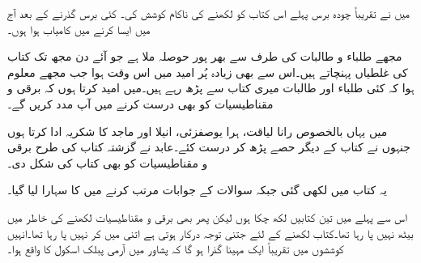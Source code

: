 میں نے تقریباً چودہ برس پہلے اس کتاب کو لکھنے کی ناکام کوشش کی۔ کئی برس گذرنے کے بعد آج میں ایسا کرنے میں کامیاب ہوا ہوں۔

مجھے طلباء و طالبات کی طرف سے بھر پور حوصلہ ملا ہے جو آئے دن مجھ تک کتاب کی غلطیاں پہنچاتے ہیں۔اس سے بھی زیادہ پُر امید میں اس وقت ہوا جب مجھے معلوم ہوا کہ کئی طلباء اور طالبات میری کتاب سے پڑھ رہے ہیں۔میں امید کرتا ہوں کہ برقی و مقناطیسیات کو بھی درست کرنے میں آپ مدد کریں گے۔

میں یہاں بالخصوص رانا لیاقت، ہرا یوصفزئی، انیلا اور ماجد کا شکریہ ادا کرتا ہوں جنہوں نے کتاب کے دیگر حصے پڑھ کر درست کئے۔عابد نے گزشتہ کتاب کی طرح برقی و مقناطیسیات کو بھی کتاب کی شکل دی۔

یہ کتاب  میں لکھی گئی جبکہ سوالات کے جوابات مرتب کرنے میں  کا سہارا لیا گیا۔

اس سے پہلے میں تین کتابیں لکھ چکا ہوں لیکن پھر بھی برقی و مقناطیسیات لکھنے کی خاطر میں بیٹھ نہیں پا رہا تھا۔کتاب لکھنے کے لئے جتنی توجہ درکار ہوتی ہے اتنی میں کر نہیں پا رہا تھا۔انہیں کوششوں میں تقریباً ایک مہینا گذرا ہو گا کہ پشاور میں آرمی پبلک اسکول کا واقع ہوا۔ 
